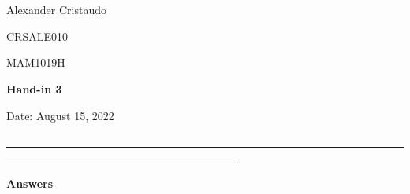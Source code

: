 \documentclass[12pt, a4paper]{exam}
\begin{document}
	\noindent
	\begin{minipage}[l]{0.1\textwidth}
		\noindent
	\end{minipage}
\hfill
\begin{minipage}[c]{1.0\textwidth}
	\begin{center}
		
		{
		\large \ \ \par
		\large \ \ \par
		\large  Alexander Cristaudo \par
		\small	CRSALE010	\par
		\large	MAM1019H	\par
	\large \textbf{Hand-in 3}	\par
\small	Date: August 15, 2022}
	\end{center}
\end{minipage}
\par
\vspace{0.2in}
\noindent
\uline{ \ \ \ \ \ \ \ \ \ \ \ \ \ \ \ \ \ \ \ \ \ \ \ \ \ \ \ \ \ \ \ \ \ \ \ \ \ \ \ \ \ \ \ \ \ \ \ \ \ \ \ \ \ \ \ \ \ \ \ \ \ \ \ \ \ \ \ \ \ \ \ \ \ \ \ \ \ \  \ \ \ \ \ \ \ \ \ \ \ \ \ \  \ \ \ \ \ \ \ \ \ \ \ \ \ \ \ \ \ \ \ \ \ \ }
\par 
\vspace{0.15in}
\noindent
\centering
{\small \bfseries 	Answers}
\end{document}

